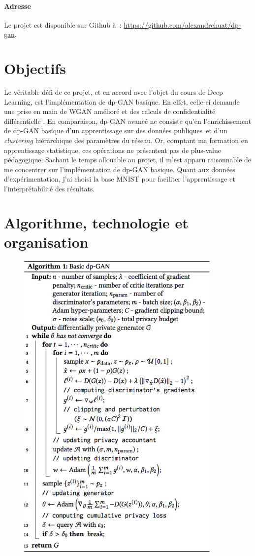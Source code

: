 \documentclass[a4paper,11pt,twoside]{article}
\theoremstyle{definition}
\newcommand{\DL}{Deep Learning}
\begin{document}
\paragraph{Adresse}
Le projet est disponible sur Github à : \url{https://github.com/alexandrehuat/dp-gan}.


\section{Objectifs}
\label{obj}

Le véritable défi de ce projet, et en accord avec l'objet du cours de \DL, est l'implémentation de dp-GAN basique. En effet, celle-ci demande une prise en main de WGAN amélioré et des calculs de confidentialité différentielle \citep{dlwdp, pinq}. En comparaison, dp-GAN avancé ne consiste qu'en l'enrichissement de dp-GAN basique d'un apprentissage sur des données publiques et d'un \textit{clustering} hiérarchique des paramètres du réseau. Or, comptant ma formation en apprentissage statistique, ces opérations ne présentent pas de plus-value pédagogique. Sachant le temps allouable au projet, il m'est apparu raisonnable de me concentrer sur l'implémentation de dp-GAN basique. Quant aux données d'expérimentation, j'ai choisi la base MNIST pour faciliter l'apprentissage et l'interprétabilité des résultats.


\section{Algorithme, technologie et organisation}
\label{techno}

\begin{figure}
    \includegraphics[width=10cm]{alg1.png}
\end{figure}
\end{document}
